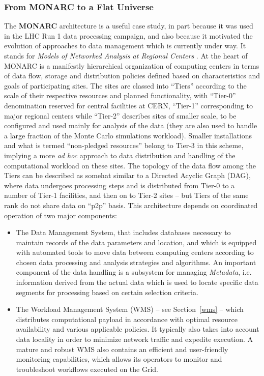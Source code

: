 \subsubsection{From MONARC to a Flat Universe}
The \textbf{MONARC} architecture is a useful case study, in part because it was used in the LHC Run 1 data processing campaign,
and also because it motivated the evolution of approaches to data management which is currently under way.
It stands for \textit{Models of Networked Analysis at Regional Centers} \cite{monarc}.
At the heart of  MONARC  is a manifestly hierarchical organization of computing centers in terms of
data flow, storage and distribution policies defined based on characteristics and goals of participating sites. The sites
are classed into ``Tiers'' according to the scale of their respective resources and planned functionality, with ``Tier-0'' denomination
reserved for central facilities at CERN, ``Tier-1'' corresponding to major regional centers while ``Tier-2'' describes
sites of smaller scale, to be configured and used mainly for analysis of the data (they are also used
to handle a large fraction of the Monte Carlo simulations workload). Smaller installations and what is termed ``non-pledged resources'' 
belong to Tier-3 in this scheme, implying a more \textit{ad hoc} approach to data distribution and handling of the computational
workload on these sites. The topology of the data flow among the
Tiers can be described as somehat similar to a Directed Acyclic Graph (DAG), where data undergoes processing steps 
and is distributed from Tier-0 to a number of Tier-1 facilities, and then on to Tier-2 sites -- but Tiers of the same rank
do not share data on ``p2p'' basis.
This architecture depends on coordinated operation of two major components:
\begin{itemize}
	\item The Data Management System, that includes databases necessary to maintain records of the data parameters and location,
	and which is equipped with automated tools to move data between 
	computing centers according to chosen data processing and analysis strategies and algorithms. 
	An important component of the data handling is a subsystem for managing \textit{Metadata}, i.e. information
	derived from the actual data which is used to locate specific data segments for processing based on 
	certain selection criteria.
	
	\item The Workload Management System (WMS) -- see Section~\ref{wms} -- which distributes computational payload in accordance  
	with optimal resource availability and various applicable policies. It typically also takes
	into account data locality in order to minimize network traffic and expedite execution. A mature 
	and robust WMS also contains an efficient and user-friendly monitoring capabilities, which allows 
	its operators to monitor and troubleshoot workflows executed on the Grid.
	
\end{itemize}

